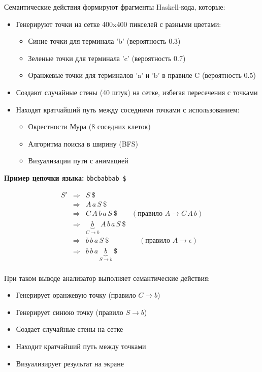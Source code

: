 \documentclass[areasetadvanced]{scrartcl}
\begin{document}
  \vspace{1em}
  \medskip
  \noindent
  Семантические действия формируют фрагменты Haskell-кода, которые:
  \begin{itemize}
    \item Генерируют точки на сетке 400x400 пикселей с разными цветами:
      \begin{itemize}
        \item Синие точки для терминала 'b' (вероятность 0.3)
        \item Зеленые точки для терминала 'c' (вероятность 0.7)
        \item Оранжевые точки для терминалов 'a' и 'b' в правиле C (вероятность 0.5)
      \end{itemize}
    \item Создают случайные стены (40 штук) на сетке, избегая пересечения с точками
    \item Находят кратчайший путь между соседними точками с использованием:
      \begin{itemize}
        \item Окрестности Мура (8 соседних клеток)
        \item Алгоритма поиска в ширину (BFS)
        \item Визуализации пути с анимацией
      \end{itemize}
  \end{itemize}
  
  \bigskip
  \noindent
  \noindent\textbf{Пример цепочки языка:}\; \texttt{bbcbabbab \$}

  \[
  \begin{array}{lcl}
  S' &\Rightarrow& S\ \$                                                   \\[2pt]
     &\Rightarrow& A\,a\,S\ \$                                             \\[2pt]
     &\Rightarrow& C\,A\,b\,a\,S\ \$ \qquad(\text{правило }A\to C\,A\,b)  \\[2pt]
     &\Rightarrow& \underbrace{b}_{C\to b}\,A\,b\,a\,S\ \$                \\[2pt]
     &\Rightarrow& b\,b\,a\,S\ \$ \qquad\qquad\;(\text{правило }A\to\epsilon)\\[2pt]
     &\Rightarrow& b\,b\,a\,\underbrace{b}_{S\to b}\ \$                  \\[2pt]
  \end{array}
  \]
  
  \medskip
  При таком выводе анализатор выполняет семантические действия:
  \begin{itemize}
    \item Генерирует оранжевую точку (правило $C\to b$)
    \item Генерирует синюю точку (правило $S\to b$)
    \item Создает случайные стены на сетке
    \item Находит кратчайший путь между точками
    \item Визуализирует результат на экране
  \end{itemize}
\end{document}
